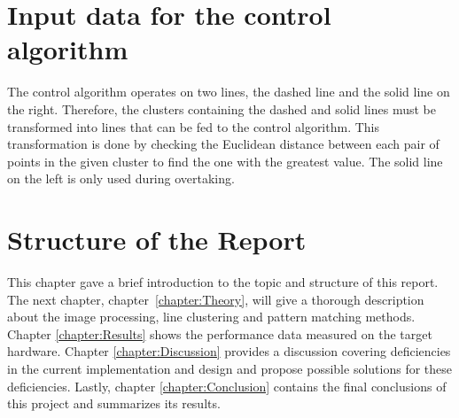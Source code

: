\documentclass[Report.tex]{subfiles}
\begin{document}
\section{Input data for the control algorithm} %
The control algorithm operates on two lines, the dashed line and the solid line
on the right. Therefore, the clusters containing the dashed and solid lines
must be transformed into lines that can be fed to the control algorithm. This
transformation is done by checking the Euclidean distance between each pair of
points in the given cluster to find the one with the greatest value. The solid
line on the left is only used during overtaking.

\section{Structure of the Report} %
This chapter gave a brief introduction to the topic and structure of this
report. The next chapter, chapter~\ref{chapter:Theory}, will give a thorough
description about the image processing, line clustering and pattern matching
methods. Chapter \ref{chapter:Results} shows the performance data measured on
the target hardware. Chapter \ref{chapter:Discussion} provides a discussion
covering deficiencies in the current implementation and design and propose
possible solutions for these deficiencies. Lastly, chapter
\ref{chapter:Conclusion} contains the final conclusions of this project and
summarizes its results.
\end{document}
